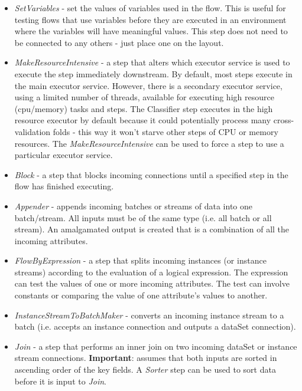 \begin{itemize}
  \item \textit{SetVariables} - set the values of variables used in the flow. This is useful for
    testing flows that use variables before they are executed in an environment where the variables
    will have meaningful values. This step does not need to be connected to any others - just place
    one on the layout.
  \item \textit{MakeResourceIntensive} - a step that alters which executor service is used to
    execute the step immediately downstream. By default, most steps execute in the main executor
    service. However, there is a secondary executor service, using a limited number of threads, 
    available for executing high resource (cpu/memory) tasks and steps. The Classifier step 
    executes in the high resource executor by default because it could potentially process
    many cross-validation folds - this way it won't starve other steps of CPU or memory
    resources. The \textit{MakeResourceIntensive} can be used to force a step to use a particular
    executor service.
  \item \textit{Block} - a step that blocks incoming connections until a specified step in the flow
    has finished executing.
  \item \textit{Appender} - appends incoming batches or streams of data into one batch/stream. All
    inputs must be of the same type (i.e. all batch or all stream). An amalgamated output is created
    that is a combination of all the incoming attributes.
  \item \textit{FlowByExpression} - a step that splits incoming instances (or instance streams) 
    according to the evaluation of a logical expression. The expression can test the values of
    one or more incoming attributes. The test can involve constants or comparing the value of
    one attribute's values to another.
  \item \textit{InstanceStreamToBatchMaker} - converts an incoming instance stream to a batch
    (i.e. accepts an instance connection and outputs a dataSet connection).
  \item \textit{Join} - a step that performs an inner join on two incoming dataSet or instance
    stream connections. \textbf{Important}: assumes that both inputs are sorted in ascending order
    of the key fields. A \textit{Sorter} step can be used to sort data before it is input to \textit{Join}.

\end{itemize}

